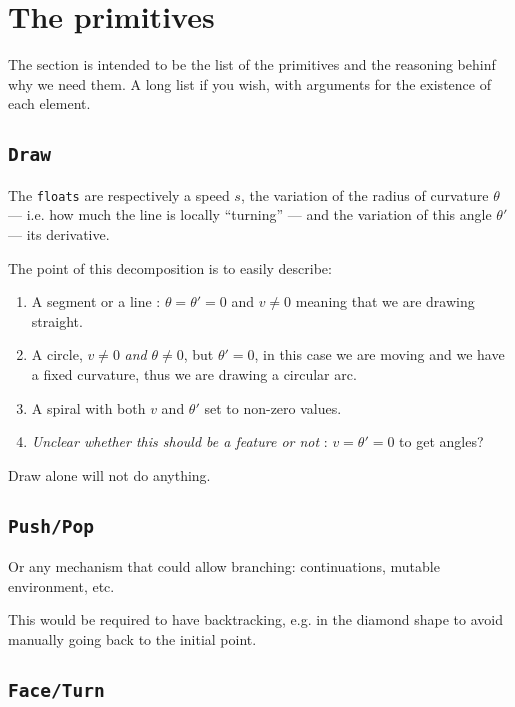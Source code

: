 \documentclass[hidelinks,12pt]{article}
\begin{document}
\section{The primitives}

    The section is intended to be the list of the primitives and the
    reasoning behinf why we need them. A long list if you wish, with arguments
    for the existence of each element.

    \subsection{\texttt{Draw}}

    The \texttt{floats} are respectively a speed $s$, the variation of the
    radius of curvature $\theta$ --- i.e. how much the line is locally
    ``turning'' --- and the variation of this angle $\theta'$ --- its
    derivative.

    The point of this decomposition is to easily describe:
    \begin{enumerate}
        \item A segment or a line : $\theta = \theta' = 0$ and $v \neq 0$
            meaning that we are drawing straight.
        \item A circle, $v \neq 0$ \emph{and} $\theta \neq 0$, but $\theta' =
            0$, in this case we are moving and we have a fixed curvature, thus
            we are drawing a circular arc.
        \item A spiral with both $v$ and $\theta'$ set to non-zero values.
        \item \emph{Unclear whether this should be a feature or not} : $v =
            \theta' = 0$ to get angles?
    \end{enumerate}

    Draw alone will not do anything.

    \subsection{\texttt{Push/Pop}}

    Or any mechanism that could allow branching: continuations, mutable
    environment, etc.

    This would be required to have backtracking, e.g. in the diamond shape to
    avoid manually going back to the initial point.

    \subsection{\texttt{Face/Turn}}
\end{document}
